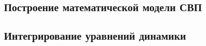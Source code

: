 \documentclass[a4paper,14pt]{extarticle}
\let\oldsection\section%
\renewcommand{\section}{%
  \renewcommand{\theequation}{\thesection.\arabic{equation}}%
  \oldsection}%
\begin{document}

\newpage
\pagestyle{myheadings}

\tableofcontents

\newpage


\setcounter{section}{1}
\addtocounter{section}{-1}

\newpage
\begin{centering}
  \section{Построение математической модели СВП}
\end{centering}











\newpage
\begin{centering}
    \section{Интегрирование уравнений динамики}
\end{centering}





\newpage


\newpage
{}
\printbibliography
\end{document}
